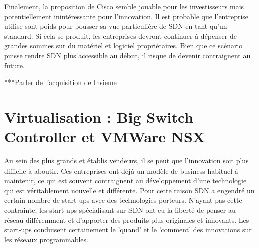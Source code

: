 Finalement, la proposition de Cisco semble jouable pour les investisseurs mais potentiellement inintéressante pour l'innovation. Il est probable que l'entreprise utilise sont poids pour pousser sa vue particulière de SDN en tant qu'un standard. Si cela se produit, les entreprises devront continuer à dépenser de grandes sommes sur du matériel et logiciel propriétaires. Bien que ce scénario puisse rendre SDN plus accessible au début, il risque de devenir contraignent au future. \cite{ExecutiveGuideToSDNCisco}


***Parler de l'acquisition de Insieme


\section{Virtualisation : Big Switch Controller et VMWare NSX}

Au sein des plus grands et établis vendeurs, il se peut que l'innovation soit plus difficile à aboutir. Ces entreprises ont déjà un modèle de business habituel à maintenir, ce qui est souvent contraignent au développement d'une technologie qui est véritablement nouvelle et différente. Pour cette raison SDN a engendré un certain nombre de start-ups avec des technologies porteurs. N'ayant pas cette contrainte, les start-ups spécialisant sur SDN ont eu la liberté de penser au réseau différemment et d'apporter des produits plus originales et innovants. Les start-ups conduisent certainement le 'quand' et le 'comment' des innovations sur les réseaux programmables. \cite{startupsSDN}


